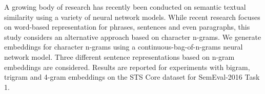 A growing body of research has recently been conducted on semantic textual similarity using a variety of neural network models. While recent research focuses on word-based representation for phrases, sentences and even paragraphs, this study considers an alternative approach based on character n-grams. We generate embeddings for character n-grams using a continuous-bag-of-n-grams neural network model. Three different sentence representations based on n-gram embeddings are considered. Results are reported for experiments with bigram, trigram and 4-gram embeddings on the STS Core dataset for SemEval-2016 Task 1.
